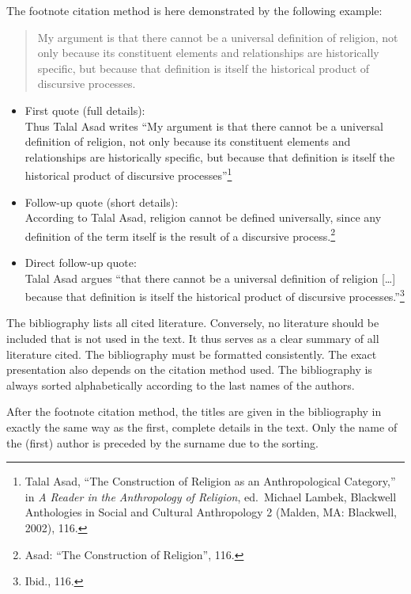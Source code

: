 \documentclass[
  english,
]{scrreprt}
\begin{document}
The footnote citation method is here demonstrated by the following example:

\begin{quote}
My argument is that there cannot be a universal definition of religion, not only because its constituent elements and relationships are historically specific, but because that definition is itself the historical product of discursive processes.
\end{quote}

\begin{itemize}
\item
  First quote (full details):\\
  Thus Talal Asad writes “My argument is that there cannot be a universal definition of religion, not only because its constituent elements and relationships are historically specific, but because that definition is itself the historical product of discursive processes”\footnote{Talal Asad, “The Construction of Religion as an Anthropological Category,” in \emph{A Reader in the Anthropology of Religion}, ed.~Michael Lambek, Blackwell Anthologies in Social and Cultural Anthropology 2 (Malden, MA: Blackwell, 2002), 116.}
\item
  Follow-up quote (short details):\\
  According to Talal Asad, religion cannot be defined universally, since any definition of the term itself is the result of a discursive process.\footnote{Asad: “The Construction of Religion”, 116.}
\item
  Direct follow-up quote:\\
  Talal Asad argues “that there cannot be a universal definition of religion {[}…{]} because that definition is itself the historical product of discursive processes.”\footnote{Ibid., 116.}
\end{itemize}

The bibliography lists all cited literature. Conversely, no literature should be included that is not used in the text. It thus serves as a clear summary of all literature cited. The bibliography must be formatted consistently. The exact presentation also depends on the citation method used. The bibliography is always sorted alphabetically according to the last names of the authors.

After the footnote citation method, the titles are given in the bibliography in exactly the same way as the first, complete details in the text. Only the name of the (first) author is preceded by the surname due to the sorting.
\end{document}
